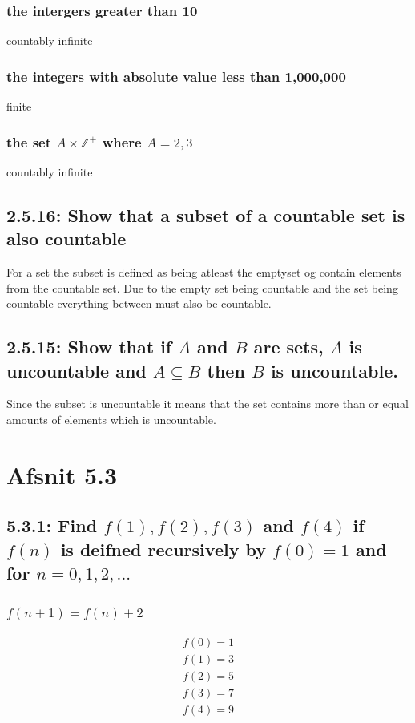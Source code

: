 \documentclass[12pt, a4paper]{report}
\begin{document}
					\subsubsection{the intergers greater than 10}
						countably infinite
					\setcounter{subsubsection}{2}
					\subsubsection{the integers with absolute value less than 1,000,000}
						finite
					\setcounter{subsubsection}{4}
					\subsubsection{the set $A\times\mathbb{Z}^+$ where $A={2,3}$}
						countably infinite
				\setcounter{subsection}{15}
				\subsection{2.5.16: Show that a subset of a countable set is also countable}
					For a set the subset is defined as being atleast the emptyset og contain elements from the countable set. Due to the empty set being countable and the set being countable everything between must also be countable.
				\setcounter{subsection}{14}
				\subsection{2.5.15: Show that if $A$ and $B$ are sets, $A$ is uncountable and $A\subseteq B$ then $B$ is uncountable.}
					Since the subset is uncountable it means that the set contains more than or equal amounts of elements which is uncountable.\\
			\section{Afsnit 5.3}
				\setcounter{subsection}{0}
				\subsection{5.3.1: Find $f(1),f(2),f(3)$ and $f(4)$ if $f(n)$ is deifned recursively by $f(0)=1$ and for $n=0,1,2,...$}
					\subsubsection{$f(n+1)=f(n)+2$}
						\begin{align*}
							f(0)=1\\
							f(1)=3\\
							f(2)=5\\
							f(3)=7\\
							f(4)=9
						\end{align*}
\end{document}
